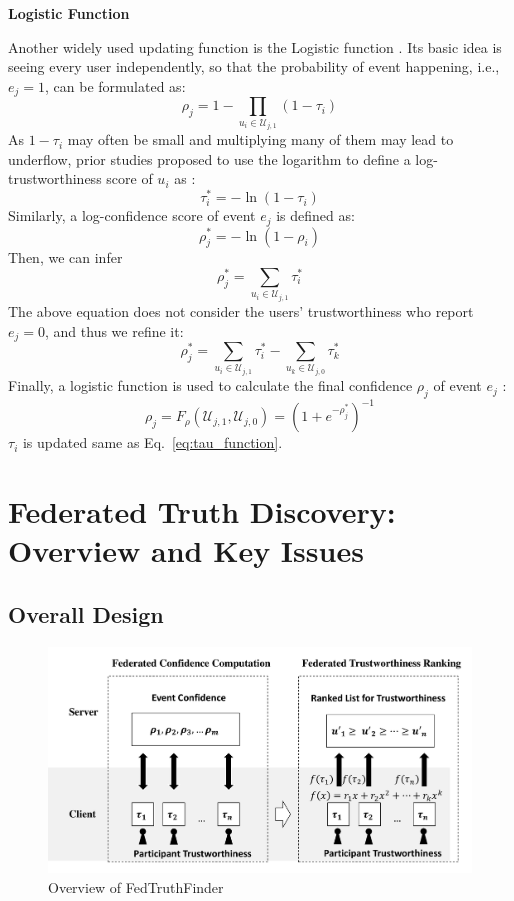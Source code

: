 \documentclass[11pt]{article}
\begin{document}
\textbf{Logistic Function}

Another widely used updating function is the Logistic function \cite{Leye-yin2008truth}. Its basic idea is seeing every user independently, so that the probability of event happening, i.e., $e_j=1$, can be formulated as:
\begin{equation}
	\rho_j = 1 - \prod_{u_i \in \mathcal U_{j,1}} (1-\tau_i)
\end{equation}
As $1-\tau_i$ may often be small and multiplying many of them may lead to underflow, prior studies proposed to use the logarithm to define a log-trustworthiness score of $u_i$ as \cite{Leye-yin2008truth}:
\begin{equation}
	\tau_i^* = - \ln(1-\tau_i)
\end{equation}
Similarly, a log-confidence score of event $e_j$ is defined as:
\begin{equation}
	\rho_j^* = - \ln(1-\rho_i)
\end{equation}
Then, we can infer
\begin{equation}
	\rho_j^* = \sum_{u_i \in \mathcal U_{j,1}} \tau_i^*
\end{equation}
The above equation does not consider the users' trustworthiness who report $e_j=0$, and thus we refine it:
\begin{equation}
	\rho_j^* = \sum_{u_i \in \mathcal U_{j,1}} \tau_i^* - \sum_{u_k \in \mathcal U_{j,0}} \tau_k^*
\end{equation}
Finally, a logistic function is used to calculate the final confidence $\rho_j$ of event $e_j$ \cite{Leye-yin2008truth}:
\begin{equation}
	\rho_j = F_\rho(\mathcal U_{j,1}, \mathcal U_{j,0}) = (1+e^{-\rho_j^*})^{-1}
	\label{eq:rho_function_log}
\end{equation}
$\tau_i$ is updated same as Eq.~\ref{eq:tau_function}. 


\section{Federated Truth Discovery: Overview and Key Issues}

\subsection{Overall Design}

\begin{figure}
	\centering
	\includegraphics[width=.8\linewidth]{submissions/LeyeWang/fig/overview.pdf}
	\caption{Overview of FedTruthFinder}
	\label{fig:overview}
\end{figure}
\end{document}
